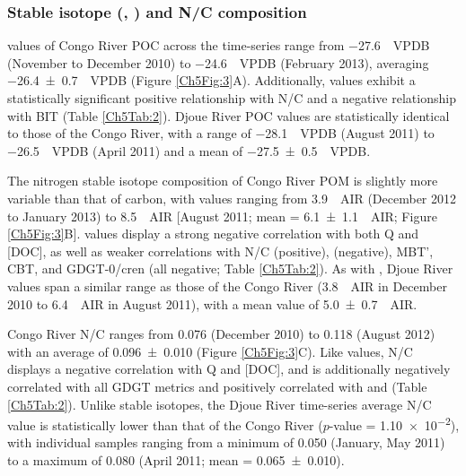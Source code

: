 \subsubsection{Stable isotope (, ) and N/C composition}

 values of Congo River POC across the time-series range from \SI{-27.6}{\permil.VPDB} (November to December 2010) to \SI{-24.6}{\permil.VPDB} (February 2013), averaging \SI{-26.4 \pm 0.7}{\permil.VPDB} (Figure \ref{Ch5Fig:3}A). Additionally,  values exhibit a statistically significant positive relationship with N/C and a negative relationship with BIT (Table \ref{Ch5Tab:2}). Djoue River POC  values are statistically identical to those of the Congo River, with a range of \SI{-28.1}{\permil.VPDB} (August 2011) to \SI{-26.5}{\permil.VPDB} (April 2011) and a mean of \SI{-27.5 \pm 0.5}{\permil.VPDB}.

The nitrogen stable isotope composition of Congo River POM is slightly more variable than that of carbon, with  values ranging from \SI{3.9}{\permil.AIR} (December 2012 to January 2013) to \SI{8.5}{\permil.AIR} [August 2011; mean = \SI{6.1 \pm 1.1}{\permil.AIR}; Figure \ref{Ch5Fig:3}B].  values display a strong negative correlation with both Q and [DOC], as well as weaker correlations with N/C (positive),  (negative), MBT', CBT, and GDGT-0/cren (all negative; Table \ref{Ch5Tab:2}). As with , Djoue River  values span a similar range as those of the Congo River (\SI{3.8}{\permil.AIR} in December 2010 to \SI{6.4}{\permil.AIR} in August 2011), with a mean value of \SI{5.0 \pm 0.7}{\permil.AIR}.

Congo River N/C ranges from \num{0.076} (December 2010) to \num{0.118} (August 2012) with an average of \num{0.096 \pm 0.010} (Figure \ref{Ch5Fig:3}C). Like  values, N/C displays a negative correlation with Q and [DOC], and is additionally negatively correlated with all GDGT metrics and positively correlated with  and  (Table \ref{Ch5Tab:2}). Unlike stable isotopes, the Djoue River time-series average N/C value is statistically lower than that of the Congo River ($p$-value = \num{1.10e-2}), with individual samples ranging from a minimum of \num{0.050} (January, May 2011) to a maximum of \num{0.080} (April 2011; mean = \num{0.065 \pm 0.010}).

